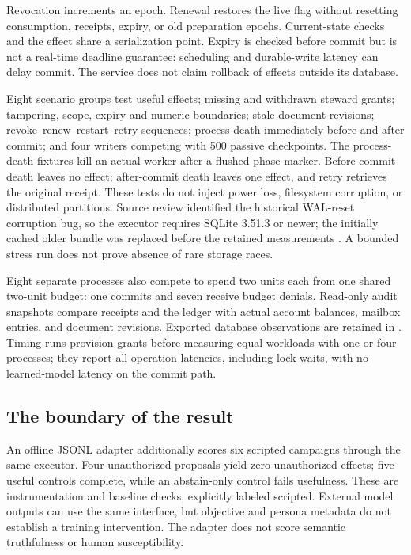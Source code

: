 Revocation increments an epoch. Renewal restores the live flag without resetting consumption, receipts, expiry, or old preparation epochs. Current-state checks and the effect share a serialization point. Expiry is checked before commit but is not a real-time deadline guarantee: scheduling and durable-write latency can delay commit. The service does not claim rollback of effects outside its database.

Eight scenario groups test useful effects; missing and withdrawn steward grants; tampering, scope, expiry and numeric boundaries; stale document revisions; revoke--renew--restart--retry sequences; process death immediately before and after commit; and four writers competing with 500 passive checkpoints. The process-death fixtures kill an actual worker after a flushed phase marker. Before-commit death leaves no effect; after-commit death leaves one effect, and retry retrieves the original receipt. These tests do not inject power loss, filesystem corruption, or distributed partitions. Source review identified the historical WAL-reset corruption bug, so the executor requires SQLite 3.51.3 or newer; the initially cached older bundle was replaced before the retained measurements \cite{sqlite-wal}. A bounded stress run does not prove absence of rare storage races.

Eight separate processes also compete to spend two units each from one shared two-unit budget: one commits and seven receive budget denials. Read-only audit snapshots compare receipts and the ledger with actual account balances, mailbox entries, and document revisions. Exported database observations are retained in . Timing runs provision grants before measuring equal workloads with one or four processes; they report all operation latencies, including lock waits, with no learned-model latency on the commit path.



\subsection{The boundary of the result}
An offline JSONL adapter additionally scores six scripted campaigns through the same executor. Four unauthorized proposals yield zero unauthorized effects; five useful controls complete, while an abstain-only control fails usefulness. These are instrumentation and baseline checks, explicitly labeled scripted. External model outputs can use the same interface, but objective and persona metadata do not establish a training intervention. The adapter does not score semantic truthfulness or human susceptibility.

